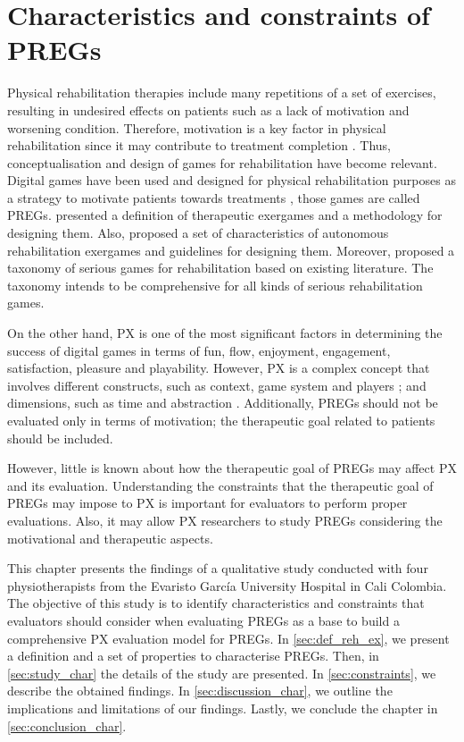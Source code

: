 \chapter{Characteristics and constraints of PREGs}
\label{ch:characterising}
Physical rehabilitation therapies include many repetitions of a set of exercises, resulting in undesired effects on patients such as a lack of motivation and worsening condition. Therefore, motivation is a key factor in physical rehabilitation since it may contribute to treatment completion \autocite{Shelton2015}. Thus, conceptualisation and design of games for rehabilitation have become relevant. Digital games have been used and designed for physical rehabilitation purposes as a strategy to motivate patients towards treatments \autocite{Brokaw2015,Burke2009,Hernandez2013,Lewis2012}, those games are called \acp{PREG}. \textcite{Pirovano2016} presented a definition of therapeutic exergames and a methodology for designing them. Also, \textcite{PirovanoAdvisor2012} proposed a set of characteristics of autonomous rehabilitation exergames and guidelines for designing them. Moreover, \textcite{Rego2018} proposed a taxonomy of serious games for rehabilitation based on existing literature. The taxonomy intends to be comprehensive for all kinds of serious rehabilitation games.

On the other hand, \ac{PX} is one of the most significant factors in determining the success of digital games in terms of fun, flow, enjoyment, engagement, satisfaction, pleasure and playability. However, \ac{PX} is a complex concept that involves different constructs, such as context, game system and players \autocite{Engl2013,Fernandez2008,Nackea2}; and dimensions, such as time and abstraction \autocite{Engl2013,Nackea2}. Additionally, \acp{PREG} should not be evaluated only in terms of motivation; the therapeutic goal related to patients should be included.

However, little is known about how the therapeutic goal of \acp{PREG} may affect \ac{PX} and its evaluation. Understanding the constraints that the therapeutic goal of \acp{PREG} may impose to \ac{PX} is important for evaluators to perform proper evaluations. Also, it may allow \ac{PX} researchers to study \acp{PREG} considering the motivational and therapeutic aspects.

This chapter presents the findings of a qualitative study conducted with four physiotherapists from the Evaristo Garc\'ia University Hospital in Cali Colombia. The objective of this study is to identify characteristics and constraints that evaluators should consider when evaluating \acp{PREG} as a base to build a comprehensive \ac{PX} evaluation model for \acp{PREG}. In \autoref{sec:def_reh_ex}, we present a definition and a set of properties to characterise \acp{PREG}. Then, in \autoref{sec:study_char} the details of the study are presented. In \autoref{sec:constraints}, we describe the obtained findings. In \autoref{sec:discussion_char}, we outline the implications and limitations of our findings. Lastly, we conclude the chapter in \autoref{sec:conclusion_char}.

